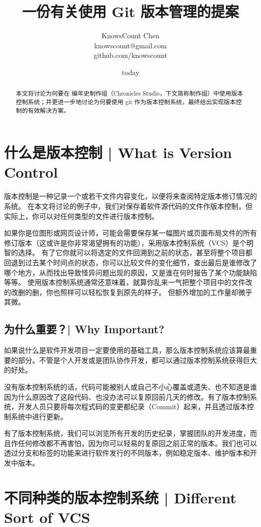 \documentclass{nle}
\title[A Proposal for the Usage of Git Version Control in Our Studio]
      {一份有关使用 Git 版本管理的提案}
\author[KnowsCount]
       {KnowsCount Chen\\
        knowscount@gmail.com\\
        github.com/knowscount}
\date{today}
\begin{document}
\label{firstpage}
\maketitle

\begin{abstract}
本文将讨论为何要在 编年史制作组（Chronicles Studio，下文简称制作组）中使用版本控制系统；并更进一步地讨论为何要使用 git 作为版本控制系统，最终给出实现版本控制的有效解决方案。
\end{abstract}

\section{什么是版本控制 | What is Version Control}

版本控制是一种记录一个或若干文件内容变化，以便将来查阅特定版本修订情况的系统。 在本文将讨论的例子中，我们对保存着软件源代码的文件作版本控制，但实际上，你可以对任何类型的文件进行版本控制。

如果你是位图形或网页设计师，可能会需要保存某一幅图片或页面布局文件的所有修订版本（这或许是你非常渴望拥有的功能），采用版本控制系统（VCS）是个明智的选择。 有了它你就可以将选定的文件回溯到之前的状态，甚至将整个项目都回退到过去某个时间点的状态，你可以比较文件的变化细节，查出最后是谁修改了哪个地方，从而找出导致怪异问题出现的原因，又是谁在何时报告了某个功能缺陷等等。 使用版本控制系统通常还意味着，就算你乱来一气把整个项目中的文件改的改删的删，你也照样可以轻松恢复到原先的样子。 但额外增加的工作量却微乎其微。

\subsection{为什么重要？| Why Important?}

如果说什么是软件开发项目一定要使用的基础工具，那么版本控制系统应该算最重要的部分。不管是个人开发或是团队协作开发，都可以通过版本控制系统获得巨大的好处。

没有版本控制系统的话，代码可能被别人或自己不小心覆盖或遗失、也不知道是谁因为什么原因改了这段代码、也没办法可以复原回前几天的修改。有了版本控制系统，开发人员只要将每次程式码的变更都纪录（Commit）起来，并且透过版本控制系统中进行更新。

有了版本控制系统，我们可以浏览所有开发的历史纪录，掌握团队的开发进度，而且作任何修改都不再害怕，因为你可以轻易的复原回之前正常的版本。我们也可以透过分支和标签的功能来进行软件发行的不同版本，例如稳定版本、维护版本和开发中版本。

\section{不同种类的版本控制系统 | Different Sort of VCS}
\end{document}
